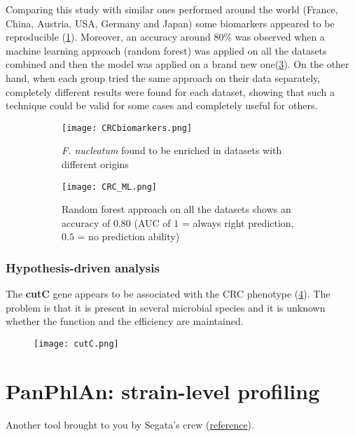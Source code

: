 Comparing this study with similar ones performed around the world (France, China, Austria, USA, Germany and Japan) some biomarkers appeared to be reproducible (\ref{fig:biomarkers}). Moreover, an accuracy around $80$\% was observed when a machine learning approach (random forest) was applied on all the datasets combined and then the model was applied on a brand new one(\ref{fig:ML}). On the other hand, when each group tried the same approach on their data separately, completely different results were found for each dataset, showing that such a technique could be valid for some cases and completely useful for others. 

\begin{figure}[!h]
\centering
\begin{subfigure}{.45\textwidth}
    \centering
    \texttt{[image: CRCbiomarkers.png]}
    \caption{\label{fig:biomarkers} \emph{F. nucleatum} found to be enriched in datasets with different origins}
\end{subfigure}
%
\begin{subfigure}{.45\textwidth}
    \centering
    \texttt{[image: CRC\_ML.png]}
    \caption{\label{fig:ML}Random forest approach on all the datasets shows an accuracy of 0.80 (AUC of $1$ = always right prediction, $0.5$ = no prediction ability)}
\end{subfigure}
\caption{}
\end{figure}


\subsubsection{Hypothesis-driven analysis}

The \textbf{cutC} gene appears to be associated with the CRC phenotype (\ref{fig:cutC}). The problem is that it is present in several microbial species and it is unknown whether the function and the efficiency are maintained.

\begin{figure}[h]
\centering
\texttt{[image: cutC.png]}
\caption{\label{fig:cutC}}
\end{figure}

\section{PanPhlAn: strain-level profiling}

Another tool brought to you by Segata’s crew (\href{http://segatalab.cibio.unitn.it/tools/panphlan/index.html}{reference}). \\

